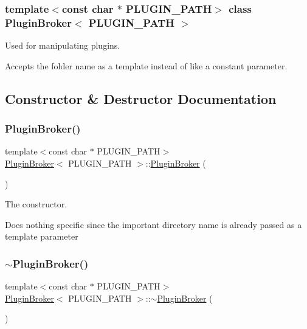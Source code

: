 \subsubsection*{template$<$const char $\ast$ P\+L\+U\+G\+I\+N\+\_\+\+P\+A\+TH$>$\newline
class Plugin\+Broker$<$ P\+L\+U\+G\+I\+N\+\_\+\+P\+A\+T\+H $>$}

Used for manipulating plugins. 

Accepts the folder name as a template instead of like a constant parameter. 

\subsection{Constructor \& Destructor Documentation}
\mbox{\label{classPluginBroker_a018134440a6cb4b7440d3e700499cd21}} 
\subsubsection{\texorpdfstring{Plugin\+Broker()}{PluginBroker()}}
{\footnotesize\ttfamily template$<$const char $\ast$ P\+L\+U\+G\+I\+N\+\_\+\+P\+A\+TH$>$ \\
\hyperlink{classPluginBroker}{Plugin\+Broker}$<$ P\+L\+U\+G\+I\+N\+\_\+\+P\+A\+TH $>$\+::\hyperlink{classPluginBroker}{Plugin\+Broker} (\begin{DoxyParamCaption}{ }\end{DoxyParamCaption})}



The constructor. 

Does nothing specific since the important directory name is already passed as a template parameter \mbox{\label{classPluginBroker_afd38dbcd03f96b4249bf4e4a67cfdf76}} 
\subsubsection{\texorpdfstring{$\sim$\+Plugin\+Broker()}{~PluginBroker()}}
{\footnotesize\ttfamily template$<$const char $\ast$ P\+L\+U\+G\+I\+N\+\_\+\+P\+A\+TH$>$ \\
\hyperlink{classPluginBroker}{Plugin\+Broker}$<$ P\+L\+U\+G\+I\+N\+\_\+\+P\+A\+TH $>$\+::$\sim$\hyperlink{classPluginBroker}{Plugin\+Broker} (\begin{DoxyParamCaption}{ }\end{DoxyParamCaption})}



